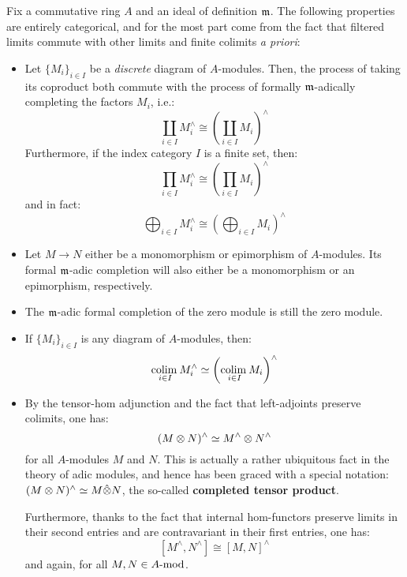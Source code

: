                 \begin{remark} \label{remark: basic_properties_of_formal_completions}
                    Fix a commutative ring $A$ and an ideal of definition $\m$. The following properties are entirely categorical, and for the most part come from the fact that filtered limits commute with other limits and finite colimits \textit{a priori}:
                        \begin{itemize}
                            \item Let $\{M_i\}_{i \in I}$ be a \textit{discrete} diagram of $A$-modules. Then, the process of taking its coproduct both commute with the process of formally $\m$-adically completing the factors $M_i$, i.e.:
                                $$\coprod_{i \in I} M_i^{\wedge} \cong \left(\coprod_{i \in I} M_i\right)^{\wedge}$$
                            Furthermore, if the index category $I$ is a finite set, then:
                                $$\prod_{i \in I} M_i^{\wedge} \cong \left(\prod_{i \in I} M_i\right)^{\wedge}$$
                            and in fact:
                                $$\bigoplus_{i \in I} M_i^{\wedge} \cong \left(\bigoplus_{i \in I} M_i\right)^{\wedge}$$  
                            \item Let $M \to N$ either be a monomorphism or epimorphism of $A$-modules. Its formal $\m$-adic completion will also either be a monomorphism or an epimorphism, respectively.
                            \item The $\m$-adic formal completion of the zero module is still the zero module.
                            \item If $\{M_i\}_{i \in I}$ is any diagram of $A$-modules, then:
                                $$\underset{i \in I}{\colim} M_i^{\wedge} \cong \left(\underset{i \in I}{\colim} M_i\right)^{\wedge}$$
                            \item By the tensor-hom adjunction and the fact that left-adjoints preserve colimits, one has:
                                $$(M \tensor N)^{\wedge} \cong M^{\wedge} \tensor N^{\wedge}$$
                            for all $A$-modules $M$ and $N$. This is actually a rather ubiquitous fact in the theory of adic modules, and hence has been graced with a special notation: $(M \tensor N)^{\wedge} \cong M \hat{\tensor} N$, the so-called \textbf{completed tensor product}.
                            
                            Furthermore, thanks to the fact that internal hom-functors preserve limits in their second entries and are contravariant in their first entries, one has:
                                $$[M^{\wedge}, N^{\wedge}] \cong [M, N]^{\wedge}$$
                            and again, for all $M, N \in A\mod$.
                        \end{itemize}
                \end{remark}
                
